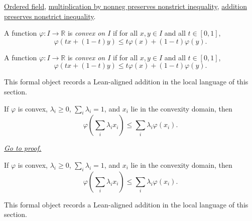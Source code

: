 \begin{dependencies}
\hyperref[def:real-ordered-field]{Ordered field},
\hyperref[thm:ineq-nonstrict-multiply-nonneg]{multiplication by nonneg preserves nonstrict inequality},
\hyperref[thm:ineq-nonstrict-add-both-sides]{addition preserves nonstrict inequality}.
\end{dependencies}

\begin{definition}
\label{def:is-convex-on-r}
A function $\varphi:I\to\mathbb R$ is \emph{convex on $I$} if for all $x,y\in I$ and all $t\in[0,1]$,
\[
  \varphi(tx+(1-t)y)\le t\varphi(x)+(1-t)\varphi(y).
\]
\end{definition}

\begin{remark*}
A function $\varphi:I\to\mathbb R$ is \emph{convex on $I$} if for all $x,y\in I$ and all $t\in[0,1]$,
\[
  \varphi(tx+(1-t)y)\le t\varphi(x)+(1-t)\varphi(y).
\]
\end{remark*}

\begin{remark*}[Interpretation]
This formal object records a Lean-aligned addition in the local language of this section.
\end{remark*}

\begin{dependencies}
\NoLocalDependencies
\end{dependencies}
\begin{theorem}
\label{thm:jensens-inequality-finite}
If $\varphi$ is convex, $\lambda_i\ge0$, $\sum_i\lambda_i=1$, and $x_i$ lie in the convexity domain, then
\[
  \varphi\!\left(\sum_i\lambda_i x_i\right)\le \sum_i\lambda_i\varphi(x_i).
\]

\smallskip
\noindent
\hyperref[prf:jensens-inequality-finite]{\textit{Go to proof.}}
\end{theorem}

\begin{remark*}
If $\varphi$ is convex, $\lambda_i\ge0$, $\sum_i\lambda_i=1$, and $x_i$ lie in the convexity domain, then
\[
  \varphi\!\left(\sum_i\lambda_i x_i\right)\le \sum_i\lambda_i\varphi(x_i).
\]
\end{remark*}

\begin{remark*}[Interpretation]
This formal object records a Lean-aligned addition in the local language of this section.
\end{remark*}

\begin{dependencies}
\NoLocalDependencies
\end{dependencies}
